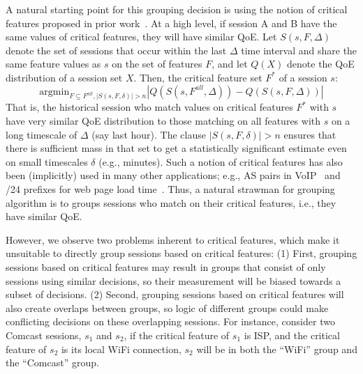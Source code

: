  A natural starting point for this grouping decision is 
 using the notion of critical features proposed in prior work~\cite{cfa}.  At a high level,
 if session A and B have the same values of  critical features,
 they will have similar QoE. 
Let  $\mathit{S}(s,F,\Delta)$ denote the 
  set of sessions that occur within the last $\Delta$ 
 time interval and share the same  feature values as $s$ on the set of features $F$, and 
 let $Q(X)$ denote the QoE distribution of a session set $X$. 
Then, the critical feature set $F^*$ of a session $s$:
\begin{displaymath}
\textrm{argmin}_{F\subseteq F^{\mathit{all}},  |S(s,F,\delta)| > n} | Q(S(s,F^{\mathit{all}},\Delta)) - Q(S(s,F,\Delta))| 
\end{displaymath}
That is, the historical session who match values on critical features $F^*$ with $s$ 
have very similar QoE distribution to those matching on all features with $s$ on a 
long timescale of $\Delta$ (say last hour).
 The   clause $|S(s,F,\delta)| > n$  ensures that  there is sufficient mass in that set 
 to get a statistically significant estimate even on small timescales $\delta$ (e.g., minutes). 
 Such a notion of critical features has also been (implicitly) used in many other
applications; e.g., AS pairs in VoIP~\cite{via} and 
 /24 prefixes for web page load time~\cite{footprint}.
 Thus,  a natural strawman for grouping algorithm is to groups sessions who match on their critical features,
 i.e., they have similar QoE.
  

However, we observe two  problems inherent to critical features, which make
it unsuitable to directly group sessions based on critical features:
(1) First, grouping sessions based on critical features may result in groups that consist of
only sessions using similar decisions, so their measurement will be biased towards a subset of decisions.
(2) Second, grouping sessions based on critical features will also create overlaps between groups, so 
\mab logic of different groups could make conflicting decisions on these overlapping sessions.
For instance, consider two Comcast sessions, $s_1$ and $s_2$, if the critical feature of $s_1$ is ISP, 
and the critical feature of $s_2$ is its local WiFi connection, 
$s_2$ will be in both the ``WiFi'' group and the ``Comcast'' group. 

